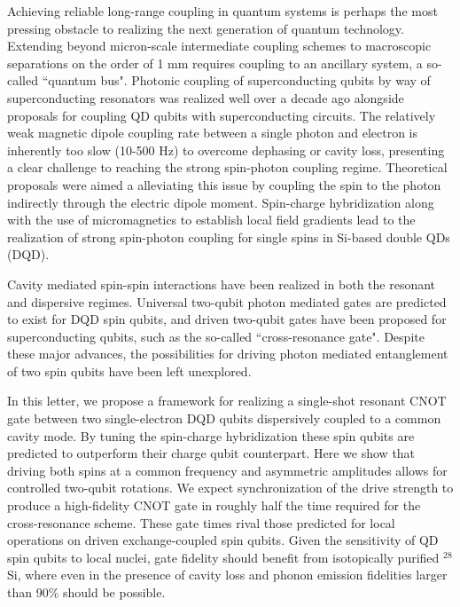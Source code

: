 \documentclass[%
 reprint,
 amsmath,amssymb,
 aps,
prl,
longbibliography
]{revtex4-1}
\begin{document}
Achieving reliable long-range coupling in quantum systems is  perhaps the most pressing obstacle to realizing the next generation of quantum technology. Extending beyond micron-scale intermediate coupling schemes\cite{Hassler2015, Tosi2017} to macroscopic separations on the order of 1 mm requires coupling to an ancillary system\cite{Kimble2008,Schuetz2015}, a so-called ``quantum bus". Photonic coupling of superconducting qubits by way of superconducting resonators was realized well over a decade ago \cite{Majer2007} alongside proposals for coupling QD qubits with superconducting circuits\cite{Childress2004, Burkard2006, Srinivasa2016}. The relatively weak magnetic dipole coupling rate between a single photon and electron is inherently too slow (10-500 Hz) to overcome dephasing or cavity loss, presenting a clear challenge to reaching the strong spin-photon coupling regime\cite{Burkard2020}. Theoretical proposals were aimed a alleviating this issue by coupling the spin to the photon indirectly through the electric dipole moment\cite{Cottet2010}. Spin-charge hybridization along with the use of micromagnetics to establish local field gradients lead to the realization of strong spin-photon coupling for single spins in Si-based double QDs (DQD)\cite{Samkharadze2018, Mi2018}. 

Cavity mediated spin-spin interactions have been realized in both the resonant\cite{Borjans2020} and dispersive\cite{Harvey-Collard2022} regimes. Universal two-qubit photon mediated gates are predicted to exist for DQD spin qubits\cite{Benito2019a, Warren2019}, and driven two-qubit gates have been proposed for superconducting qubits, such as the so-called ``cross-resonance gate"\cite{Rigetti2010}. Despite these major advances, the possibilities for driving photon mediated entanglement of two spin qubits have been left unexplored. 

In this letter, we propose a framework for realizing a single-shot resonant CNOT gate between two single-electron DQD qubits dispersively coupled to a common cavity mode. By tuning the spin-charge hybridization these spin qubits are predicted to outperform their charge qubit counterpart\cite{Benito2019a}. Here we show that driving both spins at a common frequency and asymmetric amplitudes allows for controlled two-qubit rotations. We expect synchronization of the drive strength to produce a high-fidelity CNOT gate in roughly half the time required for the cross-resonance scheme. These gate times rival those predicted for local operations on driven exchange-coupled spin qubits\cite{Russ2018}. Given the sensitivity of QD spin qubits to local nuclei, gate fidelity should benefit from isotopically purified $^{28}$Si, where even in the presence of cavity loss and phonon emission fidelities larger than 90\% should be possible.
\end{document}
